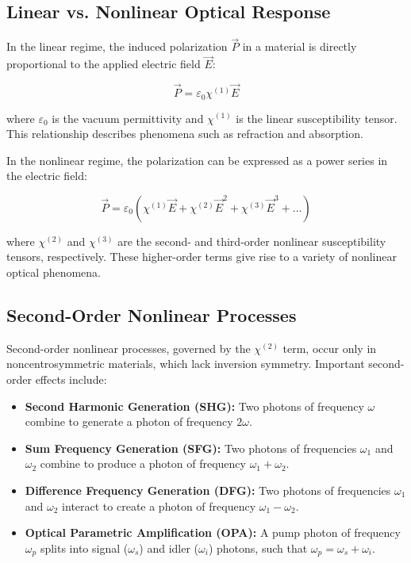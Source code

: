 \subsection{Linear vs. Nonlinear Optical Response}
\label{subsec:linear_vs_nonlinear}

\noindent In the linear regime, the induced polarization $\vec{P}$ in a material is directly proportional to the applied electric field $\vec{E}$:

\begin{equation}
	\vec{P} = \varepsilon_0 \chi^{(1)} \vec{E}
	\label{eq:linear_polarization}
\end{equation}

\noindent where $\varepsilon_0$ is the vacuum permittivity and $\chi^{(1)}$ is the linear susceptibility tensor. This relationship describes phenomena such as refraction and absorption.

\noindent In the nonlinear regime, the polarization can be expressed as a power series in the electric field:

\begin{equation}
	\vec{P} = \varepsilon_0 (\chi^{(1)} \vec{E} + \chi^{(2)} \vec{E}^2 + \chi^{(3)} \vec{E}^3 + \ldots)
	\label{eq:nonlinear_polarization}
\end{equation}

\noindent where $\chi^{(2)}$ and $\chi^{(3)}$ are the second- and third-order nonlinear susceptibility tensors, respectively. These higher-order terms give rise to a variety of nonlinear optical phenomena.

\subsection{Second-Order Nonlinear Processes}
\label{subsec:second_order}

\noindent Second-order nonlinear processes, governed by the $\chi^{(2)}$ term, occur only in noncentrosymmetric materials, which lack inversion symmetry. Important second-order effects include:

\begin{itemize}
	\item \textbf{Second Harmonic Generation (SHG):} Two photons of frequency $\omega$ combine to generate a photon of frequency $2\omega$.
	\item \textbf{Sum Frequency Generation (SFG):} Two photons of frequencies $\omega_1$ and $\omega_2$ combine to produce a photon of frequency $\omega_1 + \omega_2$.
	\item \textbf{Difference Frequency Generation (DFG):} Two photons of frequencies $\omega_1$ and $\omega_2$ interact to create a photon of frequency $\omega_1 - \omega_2$.
	\item \textbf{Optical Parametric Amplification (OPA):} A pump photon of frequency $\omega_p$ splits into signal ($\omega_s$) and idler ($\omega_i$) photons, such that $\omega_p = \omega_s + \omega_i$.
\end{itemize}

